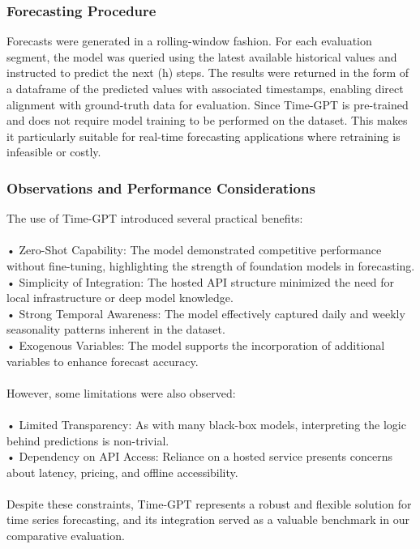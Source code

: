\documentclass{article}
\begin{document}
\subsubsection{Forecasting Procedure}
Forecasts were generated in a rolling-window fashion. For each evaluation segment, the model was queried using the latest available historical values and instructed to predict the next (h) steps. The results were returned in the form of a dataframe of the predicted values with associated timestamps, enabling direct alignment with ground-truth data for evaluation.
Since Time-GPT is pre-trained and does not require model training to be performed on the dataset. This makes it particularly suitable for real-time forecasting applications where retraining is infeasible or costly.\\


\subsubsection{Observations and Performance Considerations}
The use of Time-GPT introduced several practical benefits:\\
\\
•	Zero-Shot Capability: The model demonstrated competitive performance without fine-tuning, highlighting the strength of foundation models in forecasting.\\
•	Simplicity of Integration: The hosted API structure minimized the need for local infrastructure or deep model knowledge.\\
•	Strong Temporal Awareness: The model effectively captured daily and weekly seasonality patterns inherent in the dataset.\\
•	Exogenous Variables: The model supports the incorporation of additional variables to enhance forecast accuracy.\\
\\
However, some limitations were also observed:\\
\\
•	Limited Transparency: As with many black-box models, interpreting the logic behind predictions is non-trivial.\\
•	Dependency on API Access: Reliance on a hosted service presents concerns about latency, pricing, and offline accessibility.\\
\\
Despite these constraints, Time-GPT represents a robust and flexible solution for time series forecasting, and its integration served as a valuable benchmark in our comparative evaluation.
\end{document}
